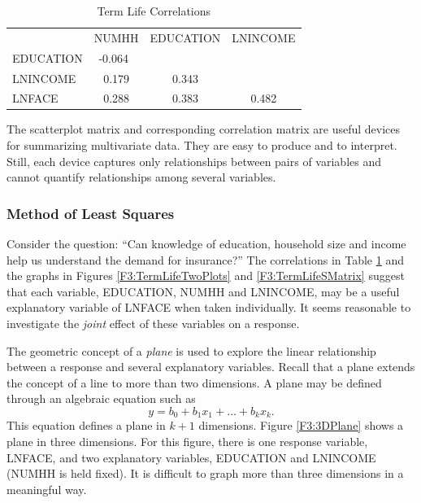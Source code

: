 \begin{table}[h]
\caption{\label{T3:Corr} Term Life Correlations}
\begin{tabular}{lccc}
\hline
          &  NUMHH    & EDUCATION & LNINCOME  \\
EDUCATION & -0.064~   \\
LNINCOME  & 0.179     & 0.343   \\
LNFACE    & 0.288     & 0.383   & 0.482     \\

\hline
\end{tabular}\end{table}

The scatterplot matrix and corresponding correlation matrix are
useful devices for summarizing multivariate data. They are easy to
produce and to interpret. Still, each device captures only
relationships between pairs of variables and cannot quantify
relationships among several variables.

\subsubsection*{Method of Least Squares}

Consider the question: ``Can knowledge of education, household size
and income help us understand the demand for insurance?'' The
correlations in Table \ref{T3:Corr} and the graphs in Figures
\ref{F3:TermLifeTwoPlots} and \ref{F3:TermLifeSMatrix} suggest that
each variable, EDUCATION, NUMHH and LNINCOME, may be a useful
explanatory variable of LNFACE when taken individually. It seems
reasonable to investigate the \emph{joint} effect of these variables
on a response.

The geometric concept of a \emph{plane} is used to explore the
linear relationship between a response and several explanatory
variables. Recall that a plane extends the concept of a line to more
than two dimensions. A plane may be defined through an algebraic
equation such as
\begin{equation*}
y = b_0 + b_1 x_1 + \ldots + b_k x_k.
\end{equation*}
This equation defines a plane in $k+1$ dimensions. Figure
\ref{F3:3DPlane} shows a plane in three dimensions. For this figure,
there is one response variable, LNFACE, and two explanatory
variables, EDUCATION and LNINCOME (NUMHH is held fixed). It is
difficult to graph more than three dimensions in a meaningful way.

